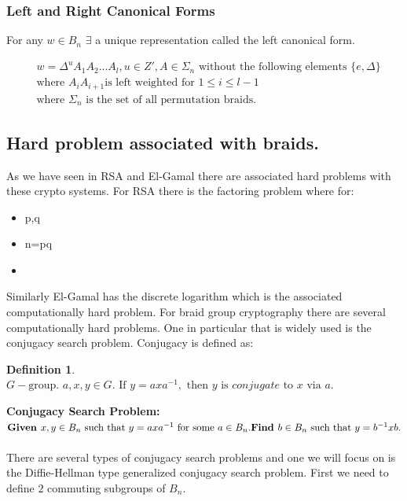 \documentclass{article}
\theoremstyle{definition}
\newtheorem{definition}{Definition}[section]
\begin{document}
	
	
	
	\subsubsection{Left and Right Canonical Forms}
	
	For any $w \in B_n$ $\exists$ a unique representation called the left canonical form.
	
	\begin{align*}
		&w = \Delta^u A_1 A_2 ... A_l, u \in Z', A \in \Sigma_n \text{ without the following elements } \{ e, \Delta \} \\
		&\text{where } A_i A_{i+1} \text{is left weighted for } 1 \leq i \leq l - 1 \\
		&\text{where } \Sigma_n \text{ is the set of all permutation braids.}
	\end{align*}
	
	\subsection{Hard problem associated with braids.}
	As we have seen in RSA and El-Gamal there are associated hard problems with these crypto systems. For RSA there is the factoring problem where for:
	
	\begin{itemize}
		\item p,q 
		\item n=pq 
		\item {} 
	\end{itemize}

Similarly El-Gamal has the discrete logarithm which is the associated computationally hard problem. 
For braid group cryptography there are several computationally hard problems. One in particular that is widely used is the conjugacy search problem. Conjugacy is defined as:
\begin{definition} 
$G-\text{group. } a,x,y \in G. \text{ If }y=axa^{-1},\text{ then }y \text{ is } conjugate \text{ to }x \text{ via }a.$
\end{definition}

\noindent \textbf{Conjugacy Search Problem:} \\ $\textbf{Given }x,y \in B_n \text{ such that }y=axa^{-1} \text{ for some }a \in B_n. \\ \textbf{Find }b \in B_n \text{ such that }y=b^{-1}xb.$
\\ \\
There are several types of conjugacy search problems and one we will focus on is the Diffie-Hellman type generalized conjugacy search problem. First we need to define $2$ commuting subgroups of $B_n$. 
\end{document}
